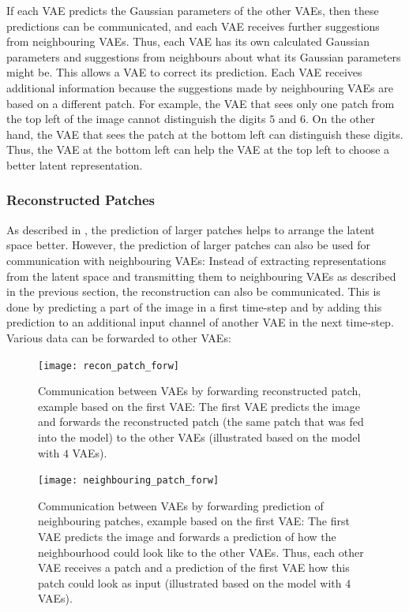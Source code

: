 If each VAE predicts the Gaussian parameters of the other VAEs, then these predictions can be communicated, and each VAE receives further suggestions from neighbouring VAEs. Thus, each VAE has its own calculated Gaussian parameters and suggestions from neighbours about what its Gaussian parameters might be. This allows a VAE to correct its prediction. Each VAE receives additional information because the suggestions made by neighbouring VAEs are based on a different patch. For example, the VAE that sees only one patch from the top left of the image cannot distinguish the digits $5$ and $6$. On the other hand, the VAE that sees the patch at the bottom left can distinguish these digits. Thus, the VAE at the bottom left can help the VAE at the top left to choose a better latent representation.


\subsubsection{Reconstructed Patches}
As described in , the prediction of larger patches helps to arrange the latent space better. However, the prediction of larger patches can also be used for communication with neighbouring VAEs: Instead of extracting representations from the latent space and transmitting them to neighbouring VAEs as described in the previous section, the reconstruction can also be communicated. This is done by predicting a part of the image in a first time-step and by adding this prediction to an additional input channel of another VAE in the next time-step. Various data can be forwarded to other VAEs:


\begin{figure}
    \centering
    \texttt{[image: recon\_patch\_forw]}
    \caption[Communication between VAEs by forwarding reconstructed patch]{Communication between VAEs by forwarding reconstructed patch, example based on the first VAE: The first VAE predicts the image and forwards the reconstructed patch (the same patch that was fed into the model) to the other VAEs (illustrated based on the model with $4$ VAEs).}
\end{figure}

\begin{figure}
    \centering
    \texttt{[image: neighbouring\_patch\_forw]}
    \caption[Communication between VAEs by forwarding prediction of neighbouring patches]{Communication between VAEs by forwarding prediction of neighbouring patches, example based on the first VAE: The first VAE predicts the image and forwards a prediction of how the neighbourhood could look like to the other VAEs. Thus, each other VAE receives a patch and a prediction of the first VAE how this patch could look as input (illustrated based on the model with $4$ VAEs).}
\end{figure}

